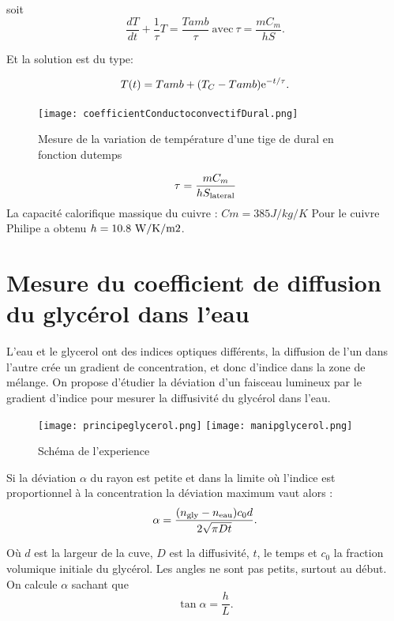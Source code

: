 \documentclass[french]{article}
\begin{document}
soit 
\begin{equation}
	\dfrac{dT}{dt}+\dfrac{1}{\tau}T=\dfrac{Tamb}{\tau}~\text{avec}~\tau=\dfrac{mC_m}{hS}.
\end{equation}

Et la solution est du type: 

\begin{equation}
	T(t)=Tamb+(T_C-Tamb){\rm e}^{-t/\tau}.
\end{equation}

\begin{figure}[ht]
	\centering
	\texttt{[image: coefficientConductoconvectifDural.png]}
	\caption{Mesure de la variation de température d'une tige de dural en fonction dutemps}
\end{figure}

\begin{equation}
	\tau= \dfrac{mC_{m}}{h S_{\rm lateral}}
\end{equation}
La capacité calorifique massique du cuivre : $Cm = 385 J/kg/K$
Pour le cuivre Philipe a obtenu $h=10.8~\rm W/K/m2$.

\section{Mesure du coefficient de diffusion du glycérol dans l'eau}
L'eau et le glycerol ont des indices optiques différents, la diffusion de l'un dans l'autre crée un gradient de concentration, et donc d'indice dans la zone de mélange. On propose d'étudier la déviation d'un faisceau lumineux par le gradient d'indice pour mesurer la diffusivité du glycérol dans l'eau. 
\begin{figure}[ht]
	\centering
	\texttt{[image: principeglycerol.png]}
	\texttt{[image: manipglycerol.png]}
	\caption{Schéma de l'experience}
\end{figure}
Si la déviation $\alpha$ du rayon est petite et dans la limite où l'indice est proportionnel à la concentration la déviation maximum vaut alors : 
\begin{equation}
	\alpha = \dfrac{(n_{\rm gly}-n_{\rm eau})c_0 d}{2\sqrt{\pi D t}}.
\end{equation}

Où $d$ est la largeur de la cuve, $D$ est la diffusivité, $t$, le temps et $c_0$ la fraction volumique initiale du glycérol. Les angles ne sont pas petits, surtout au début. On calcule $\alpha$ sachant que \begin{equation}
	\tan{\alpha} = \dfrac{h}{L}.
\end{equation}
\end{document}
